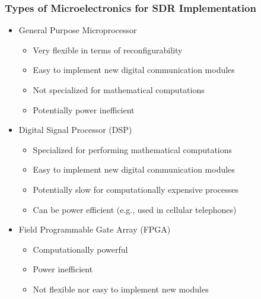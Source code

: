 \documentclass[10pt]{beamer}
\begin{document}
\frame
{
  \frametitle{Types of Microelectronics for SDR Implementation}
  \begin{itemize}
    \item General Purpose Microprocessor
    \begin{itemize}
        \item Very flexible in terms of reconfigurability
        \item Easy to implement new digital communication modules
        \item Not specialized for mathematical computations
        \item Potentially power inefficient
    \end{itemize}
    \item Digital Signal Processor (DSP)
    \begin{itemize}
        \item Specialized for performing mathematical computations
        \item Easy to implement new digital communication modules
        \item Potentially slow for computationally expensive processes
        \item Can be power efficient (e.g., used in cellular telephones)
    \end{itemize}
    \item Field Programmable Gate Array (FPGA)
    \begin{itemize}
        \item Computationally powerful
        \item Power inefficient
        \item Not flexible nor easy to implement new modules
    \end{itemize}
  \end{itemize}
}

\end{document}
